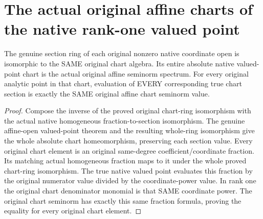 \section{The actual original affine charts of the native rank-one valued point}

\begin{theorem}
\label{thm:fc-native-rank-one-analytic-charts}
\leanok
{}
The genuine section ring of each original nonzero native coordinate
open is isomorphic to the SAME original chart algebra. Its entire
absolute native valued-point chart is the actual original affine
seminorm spectrum. For every original analytic point in that chart,
evaluation of EVERY corresponding true chart section is exactly the
SAME original affine chart seminorm value.
\end{theorem}
\begin{proof}
Compose the inverse of the proved original chart-ring isomorphism with
the actual native homogeneous fraction-to-section isomorphism. The
genuine affine-open valued-point theorem and the resulting whole-ring
isomorphism give the whole absolute chart homeomorphism, preserving
each section value. Every original chart element is an original
same-degree coefficient/coordinate fraction. Its matching actual
homogeneous fraction maps to it under the whole proved chart-ring
isomorphism. The true native valued point evaluates this fraction by
the original numerator value divided by the coordinate-power value.
In rank one the original chart denominator monomial is that SAME
coordinate power. The original chart seminorm has exactly this same
fraction formula, proving the equality for every original chart
element.
\end{proof}
